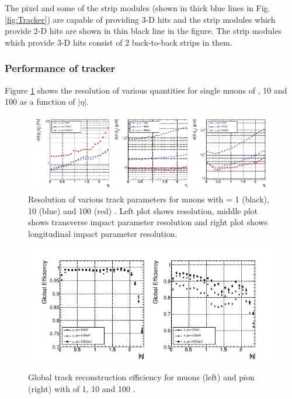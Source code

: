 The pixel and some of the strip modules (shown in thick blue lines in Fig.\ref{fig:Tracker}) are capable of providing 3-D hits and the strip modules which provide 2-D hits are shown in thin black line in the figure. The strip modules which provide 3-D hits consist of 2 back-to-back strips in them.

\subsubsection{Performance of tracker}
Figure \ref{fig:trackerResoln_muons} shows the resolution of various quantities for single muons of , 10 and 100 \gev as a function of $|\eta|$.
\begin{figure}[h!]
\centering
\includegraphics[width=0.98\linewidth]{../Figures/Chap2/trackerResoln_muons}
\caption[Tracker resolution for muons]{Resolution of various track parameters for muons with \pt = 1 \gev (black), 10 \gev (blue) and 100 \gev (red) . Left plot shows \pt resolution, middle plot shows transverse impact parameter resolution and right plot shows longitudinal impact parameter resolution.}
\label{fig:trackerResoln_muons}
\end{figure}
\begin{figure}[h!]
\centering
\includegraphics[width=0.98\linewidth]{../Figures/Chap2/trackerEff_muPions}
\caption[Track reconstruction efficiency]{Global track reconstruction efficiency for muons (left) and pion (right) with \pt of 1, 10 and 100 \gev.}
\label{fig:trackerEff_muPions}
\end{figure}

